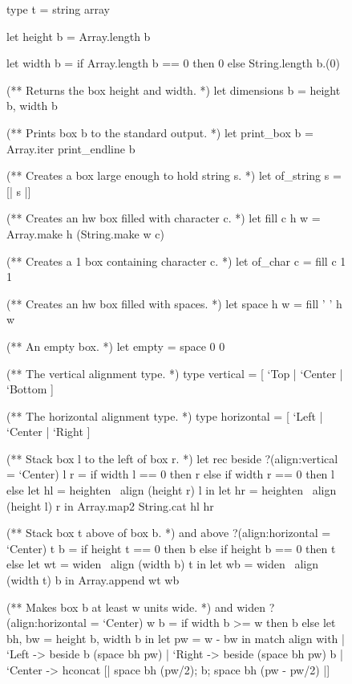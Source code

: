 \documentclass{article}
\begin{document}
\begin{figure}

\begin{code}[ocaml]
type t = string array

let height b = Array.length b\label{ref-height}

let width b = if Array.length b == 0 then 0 else String.length b.(0)\label{ref-width}

(** Returns the box height and width. *)
let dimensions b = height b, width b

(** Prints box b to the standard output. *)
let print_box b = Array.iter print_endline b\label{ref-print-box}

(** Creates a box large enough to hold string s. *)
let of_string s = [| s |]\label{ref-of-string}

(** Creates an h\times w box filled with character c. *)
let fill c h w = Array.make h (String.make w c)\label{ref-fill}

(** Creates a 1 box containing character c. *)
let of_char c = fill c 1 1\label{ref-of-char}

(** Creates an h\times w box filled with spaces. *)
let space h w = fill ' ' h w\label{ref-space}

(** An empty box. *)
let empty = space 0 0\label{ref-empty}

(** The vertical alignment type. *)
type vertical   = [ `Top  | `Center | `Bottom ]

(** The horizontal alignment type. *)
type horizontal = [ `Left | `Center | `Right  ]

(** Stack box l to the left of box r. *)
let rec beside ?(align:vertical = `Center) l r =\label{ref-beside}
    if width l == 0 then r else if width r == 0 then l
    else let hl = heighten ~align (height r) l in
         let hr = heighten ~align (height l) r in
         Array.map2 String.cat hl hr

(** Stack box t above of box b. *)
and above ?(align:horizontal = `Center) t b =\label{ref-above}
    if height t == 0 then b else if height b == 0 then t
    else let wt = widen ~align (width b) t in
         let wb = widen ~align (width t) b in
         Array.append wt wb

(** Makes box b at least w units wide. *)
and widen ?(align:horizontal = `Center) w b =\label{ref-widen}
    if width b >= w then b
    else let bh, bw = height b, width b in
         let pw = w - bw in
         match align with
         | `Left   -> beside b (space bh pw)
         | `Right  -> beside (space bh pw) b
         | `Center -> hconcat
                      [| space bh (pw/2); b; space bh (pw - pw/2) |]


\end{code}
\end{figure}
\end{document}
